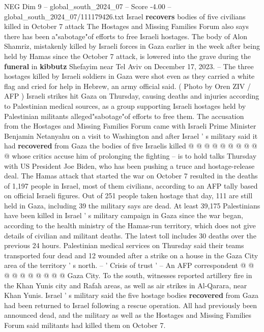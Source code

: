 \begin{textsample}{NEG Dim 9 – global\_south\_2024\_07 – Score -4.00 – global\_south\_2024\_07/111179426.txt}  \label{ex:f9_neg_337}
Israel \textbf{recovers} bodies of five civilians killed in October 7 attack The Hostages and Missing Families Forum also says there has been a"sabotage"of efforts to free Israeli hostages.
The body of Alon Shamriz, mistakenly killed by Israeli forces in Gaza earlier in the week after being held by Hamas since the October 7 attack, is lowered into the grave during the \textbf{funeral} in \textbf{kibbutz} Shefayim near Tel Aviv on December 17, 2023. -- The three hostages killed by Israeli soldiers in Gaza were shot even as they carried a white flag and cried for help in Hebrew, an army official said. ( Photo by Oren ZIV / AFP ) Israeli strikes hit Gaza on Thursday, causing deaths and injuries according to Palestinian medical sources, as a group supporting Israeli hostages held by Palestinian militants alleged"sabotage"of efforts to free them.
The accusation from the Hostages and Missing Families Forum came with Israeli Prime Minister Benjamin Netanyahu on a visit to Washington and after Israel ' s military said it had \textbf{recovered} from Gaza the bodies of five Israelis killed @ @ @ @ @ @ @ @ @ @ whose critics accuse him of prolonging the fighting -- is to hold talks Thursday with US President Joe Biden, who has been pushing a truce and hostage-release deal.
The Hamas attack that started the war on October 7 resulted in the deaths of 1,197 people in Israel, most of them civilians, according to an AFP tally based on official Israeli figures.
Out of 251 people taken hostage that day, 111 are still held in Gaza, including 39 the military says are dead.
At least 39,175 Palestinians have been killed in Israel ' s military campaign in Gaza since the war began, according to the health ministry of the Hamas-run territory, which does not give details of civilian and militant deaths.
The latest toll includes 30 deaths over the previous 24 hours.
Palestinian medical services on Thursday said their teams transported four dead and 12 wounded after a strike on a house in the Gaza City area of the territory ' s north. -- ' Crisis of trust ' -- An AFP correspondent @ @ @ @ @ @ @ @ @ @ Gaza City.
To the south, witnesses reported artillery fire in the Khan Yunis city and Rafah areas, as well as air strikes in Al-Qarara, near Khan Yunis.
Israel ' s military said the five hostage bodies \textbf{recovered} from Gaza had been returned to Israel following a rescue operation.
All had previously been announced dead, and the military as well as the Hostages and Missing Families Forum said militants had killed them on October 7.

\end{textsample}

